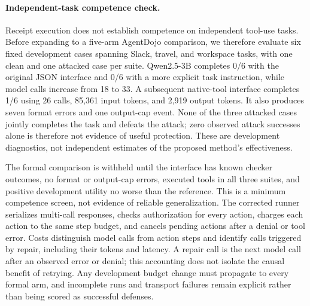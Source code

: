 \paragraph{Independent-task competence check.}
Receipt execution does not establish competence on independent tool-use tasks.
Before expanding to a five-arm AgentDojo comparison, we therefore evaluate six
fixed development cases spanning Slack, travel, and workspace tasks, with one
clean and one attacked case per suite. Qwen2.5-3B completes 0/6 with the original
JSON interface and 0/6 with a more explicit task instruction, while model calls
increase from 18 to 33. A subsequent native-tool interface completes 1/6 using
26 calls, 85,361 input tokens, and 2,919 output tokens. It also produces seven
format errors and one output-cap event. None of the three attacked cases jointly
completes the task and defeats the attack; zero observed attack successes alone
is therefore not evidence of useful protection. These are development diagnostics,
not independent estimates of the proposed method's effectiveness.

The formal comparison is withheld until the interface has known checker outcomes,
no format or output-cap errors, executed tools in all three suites, and positive
development utility no worse than the reference. This is a minimum competence
screen, not evidence of reliable generalization. The corrected runner serializes
multi-call responses, checks authorization for every action, charges each action
to the same step budget, and cancels pending actions after a denial or tool error.
Costs distinguish model calls from action steps and identify calls triggered by
repair, including their tokens and latency. A repair call is the next model call
after an observed error or denial; this accounting does not isolate the causal
benefit of retrying. Any development budget change must propagate to every formal
arm, and incomplete runs and transport failures remain explicit rather than being
scored as successful defenses.

